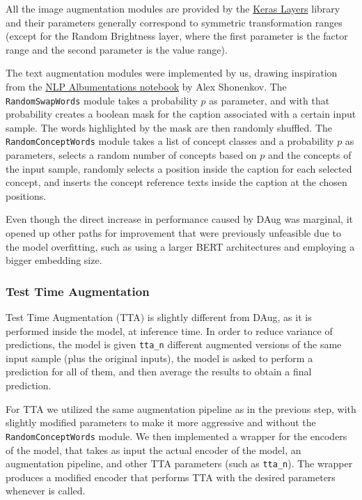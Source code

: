 \documentclass[10pt,twocolumn,letterpaper]{article}
\begin{document}
All the image augmentation modules are provided by the \href{https://www.tensorflow.org/api_docs/python/tf/keras/layers/}{Keras Layers} library and their parameters generally correspond to symmetric transformation ranges (except for the Random Brightness layer, where the first parameter is the factor range and the second parameter is the value range).

The text augmentation modules were implemented by us, drawing inspiration from the \href{https://www.kaggle.com/code/shonenkov/nlp-albumentations}{NLP Albumentations notebook} by Alex Shonenkov.
The \texttt{RandomSwapWords} module takes a probability $p$ as parameter, and with that probability creates a boolean mask for the caption associated with a certain input sample. The words highlighted by the mask are then randomly shuffled.
The \texttt{RandomConceptWords} module takes a list of concept classes and a probability $p$ as parameters, selects a random number of concepts based on $p$ and the concepts of the input sample, randomly selects a position inside the caption for each selected concept, and inserts the concept reference texts inside the caption at the chosen positions.

Even though the direct increase in performance caused by DAug was marginal, it opened up other paths for improvement that were previously unfeasible due to the model overfitting, such as using a larger BERT architectures and employing a bigger embedding size.

\subsubsection{Test Time Augmentation}
Test Time Augmentation (TTA) is slightly different from DAug, as it is performed inside the model, at inference time.
In order to reduce variance of predictions, the model is given \texttt{tta\_n} different augmented versions of the same input sample (plus the original inputs), the model is asked to perform a prediction for all of them, and then average the results to obtain a final prediction.

For TTA we utilized the same augmentation pipeline as in the previous step, with slightly modified parameters to make it more aggressive and without the \texttt{RandomConceptWords} module.
We then implemented a wrapper for the encoders of the model, that takes as input the actual encoder of the model, an augmentation pipeline, and other TTA parameters (such as \texttt{tta\_n}). The wrapper produces a modified encoder that performs TTA with the desired parameters whenever is called.
\end{document}
